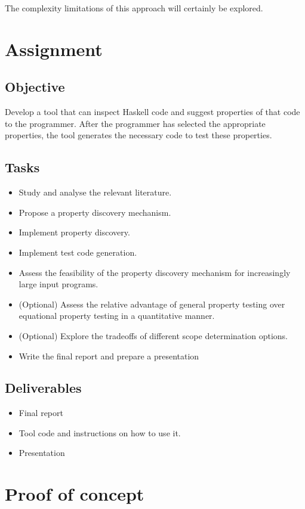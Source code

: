 \documentclass[a4paper, 11pt, onepage]{article}
\begin{document}
The complexity limitations of this approach will certainly be explored. 


\section{Assignment}

\subsection{Objective}

Develop a tool that can inspect Haskell code and suggest properties of that code to the programmer.
After the programmer has selected the appropriate properties, the tool generates the necessary code to test these properties.


\subsection{Tasks}

\begin{itemize}
  \item Study and analyse the relevant literature.
  \item Propose a property discovery mechanism.
  \item Implement property discovery.
  \item Implement test code generation.
  \item Assess the feasibility of the property discovery mechanism for increasingly large input programs.
  \item (Optional) Assess the relative advantage of general property testing over equational property testing in a quantitative manner.
  \item (Optional) Explore the tradeoffs of different scope determination options.
  \item Write the final report and prepare a presentation
\end{itemize}


\subsection{Deliverables}

\begin{itemize}
  \item Final report
  \item Tool code and instructions on how to use it.
  \item Presentation
\end{itemize}





\newpage
\appendix

\section{Proof of concept}

\label{app:poc}
\inputminted{Haskell}{poc.hs}
\end{document}
